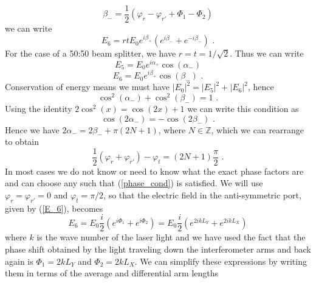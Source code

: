 \documentclass[11pt]{cuthesis}
\newcommand{\fs}{\text{ .}}
\begin{document}
\begin{equation}
\beta_-=\frac{1}{2}(\varphi_r-\varphi_{r'}+\Phi_1-\Phi_2) 
\end{equation}
we can write 
\begin{equation}
E_6=r t E_0 e^{i \beta_+}( e^{i \beta_-}+ e^{-i \beta_-}) \fs
\end{equation}
For the case of a 50:50 beam splitter, we have $r=t=1/\sqrt{2}$. Thus we can write
\begin{equation}
E_5=E_0 e^{i\alpha_+} \cos(\alpha_-)
\end{equation}
\begin{equation}
E_6=E_0 e^{i\beta_+} \cos(\beta_-) \fs
\end{equation}
Conservation of energy means we must have $|E_0|^2=|E_5|^2+|E_6|^2$, hence
\begin{equation}
\cos^2(\alpha_-)+\cos^2(\beta_-)=1 \fs
\end{equation}
Using the identity $2\cos^2(x)=\cos(2x)+1$ we can write this condition as
\begin{equation}
\cos(2\alpha_-)=-\cos(2\beta_-) \fs
\end{equation}
Hence we have $2\alpha_-=2\beta_- +\pi(2N+1)$, where $N\in \mathbb{Z}$, which we can rearrange to obtain
\begin{equation} \label{phase_cond}
\frac{1}{2}(\varphi_r+\varphi_{r'})-\varphi_t=(2N+1)\frac{\pi}{2} \fs
\end{equation}
In most cases we do not know or need to know what the exact phase factors are and can choose any such that (\ref{phase_cond}) is satisfied. We will use $\varphi_r=\varphi_{r'}=0$ and $\varphi_t=\pi/2$, %
so that the electric field in the anti-symmetric port, given by (\ref{E_6}), becomes
\begin{equation}
E_6=E_0 \frac{i}{2} \left( e^{i\Phi_1} + e^{i\Phi_2}  \right)=E_0 \frac{i}{2} \left( e^{2 i k L_Y} + e^{2 i k L_X}  \right)
\end{equation}
where $k$ is the wave number of the laser light and we have used the fact that the phase shift obtained by the light traveling down the interferometer arms and back again is $\Phi_1=2 k L_Y$ and $\Phi_2=2 k L_X$. We can simplify these expressions by writing them in terms of the average and differential arm lengths 
\end{document}
